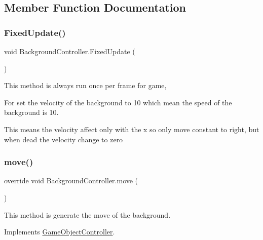 \subsection{Member Function Documentation}
\hypertarget{class_background_controller_adb5ce992d04cb58e1978ee2cc5897934}{}\label{class_background_controller_adb5ce992d04cb58e1978ee2cc5897934} 
\subsubsection{\texorpdfstring{Fixed\+Update()}{FixedUpdate()}}
{\footnotesize\ttfamily void Background\+Controller.\+Fixed\+Update (\begin{DoxyParamCaption}{ }\end{DoxyParamCaption})\hspace{0.3cm}{\ttfamily [private]}}



This method is always run once per frame for game, 

For set the velocity of the background to 10 which mean the speed of the background is 10.

This means the velocity affect only with the x so only move constant to right, but when dead the velocity change to zero 

\hypertarget{class_background_controller_ac4b0d540fa72d7c57e919c309bb8f167}{}\label{class_background_controller_ac4b0d540fa72d7c57e919c309bb8f167} 
\subsubsection{\texorpdfstring{move()}{move()}}
{\footnotesize\ttfamily override void Background\+Controller.\+move (\begin{DoxyParamCaption}{ }\end{DoxyParamCaption})\hspace{0.3cm}{\ttfamily [virtual]}}



This method is generate the move of the background. 



Implements \hyperlink{class_game_object_controller_a0d186d143e280869efaff7835730fc82}{Game\+Object\+Controller}.

